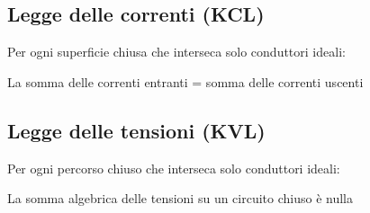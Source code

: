 \subsection*{Legge delle correnti (KCL)}
Per ogni superficie chiusa che interseca solo conduttori ideali:
\begin{center}
La somma delle correnti entranti = somma delle correnti uscenti
\end{center}

\subsection*{Legge delle tensioni (KVL)}
Per ogni percorso chiuso che interseca solo conduttori ideali:
\begin{center}
La somma algebrica delle tensioni su un circuito chiuso \`e nulla
\end{center}
